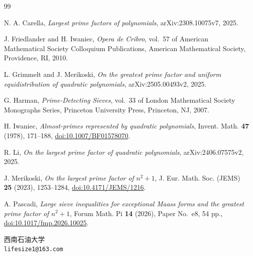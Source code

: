 \documentclass[UTF8,10pt,a4paper]{ctexart}
\newcommand{\1}{\mathbf{1}}
\theoremstyle{remark}
\begin{document}
\begingroup
\raggedright
\begin{thebibliography}{99}

N. A. Carella,
\emph{Largest prime factors of polynomials},
arXiv:2308.10075v7, 2025.

J. Friedlander and H. Iwaniec,
\emph{Opera de Cribro},
vol.~57 of American Mathematical Society Colloquium Publications,
American Mathematical Society, Providence, RI, 2010.

L. Grimmelt and J. Merikoski,
\emph{On the greatest prime factor and uniform equidistribution of quadratic polynomials},
arXiv:2505.00493v2, 2025.

G. Harman,
\emph{Prime-Detecting Sieves},
vol.~33 of London Mathematical Society Monographs Series,
Princeton University Press, Princeton, NJ, 2007.

H. Iwaniec,
\emph{Almost-primes represented by quadratic polynomials},
Invent. Math. \textbf{47} (1978), 171--188,
\href{https://doi.org/10.1007/BF01578070}{doi:10.1007/BF01578070}.

R. Li,
\emph{On the largest prime factor of quadratic polynomials},
arXiv:2406.07575v2, 2025.

J. Merikoski,
\emph{On the largest prime factor of $n^2+1$},
J. Eur. Math. Soc. (JEMS) \textbf{25} (2023), 1253--1284,
\href{https://doi.org/10.4171/JEMS/1216}{doi:10.4171/JEMS/1216}.

A. Pascadi,
\emph{Large sieve inequalities for exceptional Maass forms and the greatest prime factor of $n^2+1$},
Forum Math. Pi \textbf{14} (2026), Paper No.~e8, 54 pp.,
\href{https://doi.org/10.1017/fmp.2026.10025}{doi:10.1017/fmp.2026.10025}.

\end{thebibliography}
\endgroup

\bigskip
\noindent 西南石油大学\\
\texttt{lifesize1@163.com}
\end{document}
